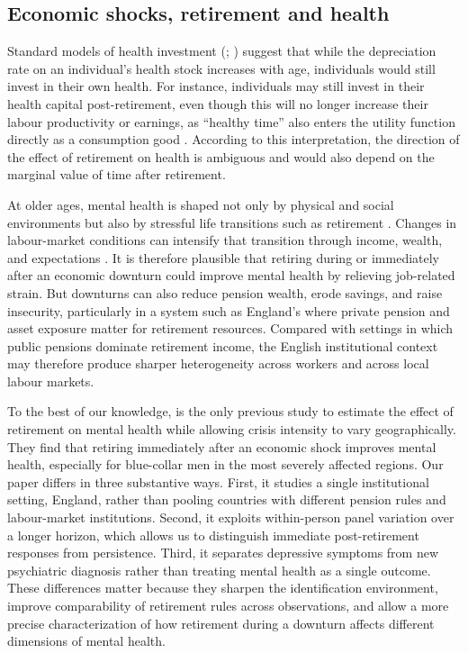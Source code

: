 \documentclass[arguments, manuscript, 11pt]{aastex631}
\begin{document}
\subsection{Economic shocks, retirement and health} \label{sec:model}

Standard models of health investment (\cite{grossman1972concept}; \cite{grossman2000human}) suggest that while the depreciation rate on an individual’s health stock increases with age, individuals would still invest in their own health. For instance, individuals may still invest in their health capital post-retirement, even though this will no longer increase their labour productivity or earnings, as “healthy time” also enters the utility function directly as a consumption good \citep{dave2006effects}. According to this interpretation, the direction of the effect of retirement on health is ambiguous and would also depend on the marginal value of time after retirement.

At older ages, mental health is shaped not only by physical and social environments but also by stressful life transitions such as retirement \citep{minkler1981research}. Changes in labour-market conditions can intensify that transition through income, wealth, and expectations \citep{black2022whose, jofre2018impact}. It is therefore plausible that retiring during or immediately after an economic downturn could improve mental health by relieving job-related strain. But downturns can also reduce pension wealth, erode savings, and raise insecurity, particularly in a system such as England's where private pension and asset exposure matter for retirement resources. Compared with settings in which public pensions dominate retirement income, the English institutional context may therefore produce sharper heterogeneity across workers and across local labour markets.

To the best of our knowledge, \cite{belloni2016effect} is the only previous study to estimate the effect of retirement on mental health while allowing crisis intensity to vary geographically. They find that retiring immediately after an economic shock improves mental health, especially for blue-collar men in the most severely affected regions. Our paper differs in three substantive ways. First, it studies a single institutional setting, England, rather than pooling countries with different pension rules and labour-market institutions. Second, it exploits within-person panel variation over a longer horizon, which allows us to distinguish immediate post-retirement responses from persistence. Third, it separates depressive symptoms from new psychiatric diagnosis rather than treating mental health as a single outcome. These differences matter because they sharpen the identification environment, improve comparability of retirement rules across observations, and allow a more precise characterization of how retirement during a downturn affects different dimensions of mental health.
\end{document}

